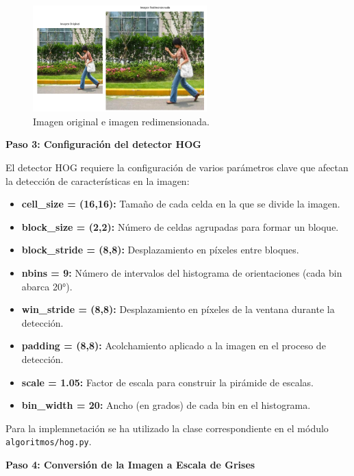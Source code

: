 \documentclass[a4paper]{article}
\begin{document}
\begin{figure}[H]
    \centering
    \includegraphics[width=0.6\textwidth]{images/hog_paso_2.png}
    \caption{Imagen original e imagen redimensionada.}
\end{figure}

\textbf{Paso 3: Configuración del detector HOG}
\par\vspace{0.5cm}

El detector HOG requiere la configuración de varios parámetros clave que afectan la detección de características en la imagen:
\begin{itemize}
    \item \textbf{cell\_size = (16,16):} Tamaño de cada celda en la que se divide la imagen.
    \item \textbf{block\_size = (2,2):} Número de celdas agrupadas para formar un bloque.
    \item \textbf{block\_stride = (8,8):} Desplazamiento en píxeles entre bloques.
    \item \textbf{nbins = 9:} Número de intervalos del histograma de orientaciones (cada bin abarca 20°).
    \item \textbf{win\_stride = (8,8):} Desplazamiento en píxeles de la ventana durante la detección.
    \item \textbf{padding = (8,8):} Acolchamiento aplicado a la imagen en el proceso de detección.
    \item \textbf{scale = 1.05:} Factor de escala para construir la pirámide de escalas.
    \item \textbf{bin\_width = 20:} Ancho (en grados) de cada bin en el histograma.
\end{itemize}

Para la implemnetación se ha utilizado la clase correspondiente en el módulo \texttt{algoritmos/hog.py}.
\par\vspace{0.5cm}

\textbf{Paso 4: Conversión de la Imagen a Escala de Grises}
\par\vspace{0.5cm}
\end{document}
